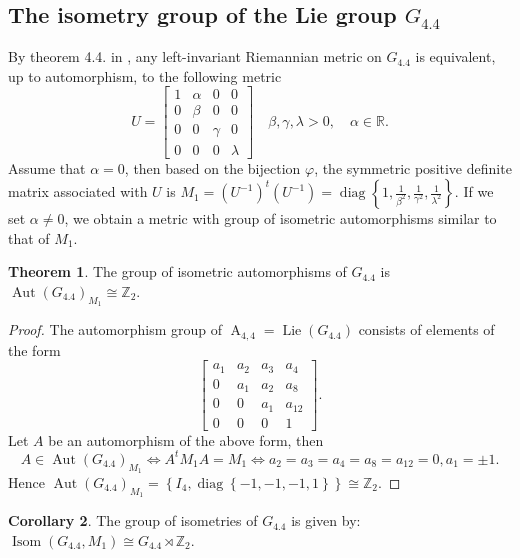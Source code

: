 \documentclass[12pt,a4paper,twoside]{article}
\theoremstyle{definition}
\newtheorem{theorem}{Theorem}[section]
\newtheorem{corollary}[theorem]{Corollary}
\begin{document}
\subsection{The isometry group of the Lie group $G_{4.4}$}
By theorem 4.4. in \cite{aitbenhaddou2025classification}, any left-invariant Riemannian metric on $G_{4.4}$ is equivalent, up to automorphism, to the following metric
$$U = \begin{bmatrix}
1 & \alpha & 0 & 0\\
0 & \beta & 0 & 0\\
0 & 0 & \gamma & 0\\
0 & 0 & 0 & \lambda
\end{bmatrix} \quad \beta, \gamma, \lambda > 0, \quad \alpha \in \mathbb{R}.$$
Assume that $\alpha = 0$, then based on the bijection $\varphi$, the symmetric positive definite matrix associated with $U$ is $M_1 = (U^{-1})^t(U^{-1}) = \operatorname{diag}\left\lbrace 1, \frac{1}{\beta^2}, \frac{1}{\gamma^2}, \frac{1}{\lambda^2}\right\rbrace$. If we set $\alpha \neq 0$, we obtain a metric with group of isometric automorphisms similar to that of $M_1$.
\begin{theorem}
The group of isometric automorphisms of $G_{4.4}$ is
$\operatorname{Aut}\left(G_{4.4}\right)_{M_1}  \cong \mathbb{Z}_2$.
\end{theorem}
\begin{proof}
The automorphism group of $\operatorname{A}_{4, 4} = \operatorname{Lie}(G_{4.4})$ consists of elements of the form \cite{christodoulakis2003automorphisms}
$$\begin{bmatrix}
a_1 & a_2 & a_3 & a_4\\
0 & a_1 & a_2 & a_8\\
0 & 0 & a_1 & a_{12}\\
0 & 0 & 0 & 1
\end{bmatrix}.$$
Let $A$ be an automorphism of the above form, then
$$A \in \operatorname{Aut}\left(G_{4.4}\right)_{M_1} \Leftrightarrow A^tM_1A = M_1 \Leftrightarrow a_2 = a_3 = a_4 = a_8 = a_{12} = 0, a_1 = \pm1.$$
Hence $\operatorname{Aut}\left(G_{4.4}\right)_{M_1} = \left\lbrace I_4, \operatorname{diag}\left\lbrace -1, -1, -1, 1\right\rbrace\right\rbrace \cong \mathbb{Z}_2$.
\end{proof}
\begin{corollary}
The group of isometries of $G_{4.4}$ is given by: $\operatorname{Isom}\left(G_{4.4}, M_1\right) \cong G_{4.4} \rtimes \mathbb{Z}_2$.
\end{corollary}
\end{document}
